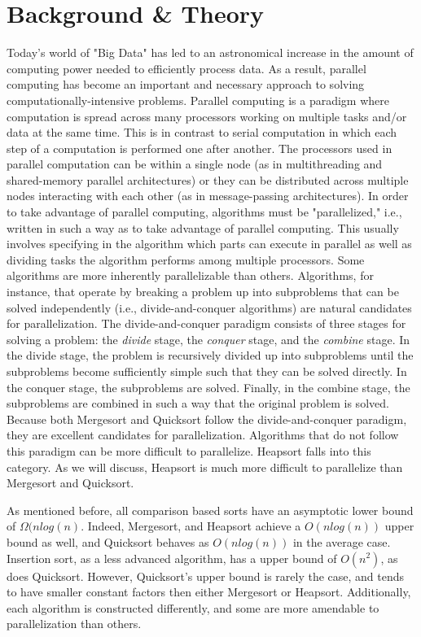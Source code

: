 \documentclass[conference]{IEEEtran}
\begin{document}
\section{Background \& Theory}
Today's world of "Big Data" has led to an astronomical increase in the amount of computing power needed to efficiently process data.
As a result, parallel computing has become an important and necessary approach to solving computationally-intensive problems.
Parallel computing is a paradigm where computation is spread across many processors working on multiple tasks and/or data at the same time. This is in contrast to serial computation in which each step of a computation is performed one after another.
The processors used in parallel computation can be within a single node (as in multithreading and shared-memory parallel architectures) or they can be distributed across multiple nodes interacting with each other (as in message-passing architectures). In order to take advantage of parallel computing, algorithms must be "parallelized," i.e., written in such a way as to take advantage of parallel computing. This usually involves specifying in the algorithm which parts can execute in parallel as well as dividing tasks the algorithm performs among multiple processors. Some algorithms are more inherently parallelizable than others. Algorithms, for instance, that operate by breaking a problem up into subproblems that can be solved independently (i.e., divide-and-conquer algorithms) are natural candidates for parallelization. The divide-and-conquer paradigm consists of three stages for solving a problem: the \textit{divide} stage, the \textit{conquer} stage, and the \textit{combine} stage. In the divide stage, the problem is recursively divided up into subproblems until the subproblems become sufficiently simple such that they can be solved directly. In the conquer stage, the subproblems are solved. Finally, in the combine stage, the subproblems are combined in such a way that the original problem is solved. Because both Mergesort and Quicksort follow the divide-and-conquer paradigm, they are excellent candidates for parallelization. Algorithms that do not follow this paradigm can be more difficult to parallelize. Heapsort falls into this category. As we will discuss, Heapsort is much more difficult to parallelize than Mergesort and Quicksort.

As mentioned before, all comparison based sorts have an asymptotic lower bound of $\Omega(nlog(n)$. 
Indeed,  Mergesort, and Heapsort achieve a $O(nlog(n))$ upper bound as well, and Quicksort behaves as $O(nlog(n))$ in the average case. 
Insertion sort, as a less advanced algorithm, has a upper bound of $O(n^2)$, as does Quicksort. \cite{cormen_introduction_2009} 
However, Quicksort's upper bound is rarely the case, and tends to have smaller constant factors then either Mergesort or Heapsort. \cite{hoare_algorithm_1961} %
Additionally, each algorithm is constructed differently, and some are more amendable to parallelization than others.
\end{document}
